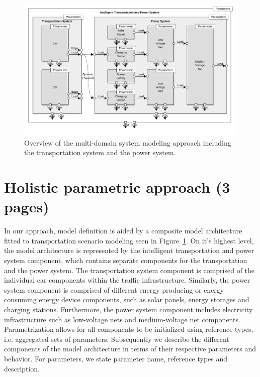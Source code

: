 \begin{figure}[h]
	\centering
	\includegraphics[width=\textwidth]{../gfx/model2.pdf}
	\caption{Overview of the multi-domain system modeling approach including the transportation system and the power system.}
	\label{fig:model}
\end{figure}

\section{Holistic parametric approach (3 pages)}
\label{section:contribution_1}

In our approach, model definition is aided by a composite model architecture fitted to transportation scenario modeling seen in Figure~\ref{fig:model}. On it's highest level, the model architecture is represented by the intelligent transportation and power system component, which contains separate components for the transportation and the power system. The transportation system component is comprised of the individual car components within the traffic infrastructure. Similarly, the power system component is comprised of different energy producing or energy consuming energy device components, such as solar panels, energy storages and charging stations. Furthermore, the power system component includes electricity infrastructure such as low-voltage nets and medium-voltage net components. Parametrization allows for all components to be initialized using reference types, i.e. aggregated sets of parameters.
Subsequently we describe the different components of the model architecture in terms of their respective parameters 
and behavior. For parameters, we state parameter name, reference types and description.

